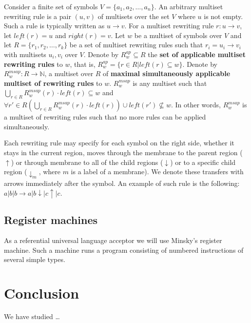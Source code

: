 \documentclass[llncs,submission,copyright,creativecommons]{../lib/lncs/llncs}
\begin{document}
Consider a finite set of symbols $V=\{a_1, a_2,\dots, a_n\}$. An arbitrary multiset rewriting rule is a pair $(u, v)$ of multisets over the set $V$ where $u$ is not empty. Such a rule is typically written as $u\rightarrow v$. For a multiset rewriting rule $r : u\rightarrow v$, let $left(r) = u$ and $right(r) = v$. Let $w$ be a multiset of symbols over $V$ and let $R=\{r_1, r_2,\dots, r_k\}$ be a set of multiset rewriting rules such that $r_i = u_i\rightarrow v_i$ with multisets $u_i, v_i$ over $V$. Denote by $R^{ap}_w\subseteq R$ the {\bf set of applicable multiset rewriting rules} to $w$, that is, $R^{ap}_w = \{r\in R|left(r)\subseteq w\}$. Denote by $R^{msap}_w: R\rightarrow \mathbb N$, a multiset over $R$ of {\bf maximal simultaneously applicable multiset of rewriting rules} to $w$. $R^{msap}_w$ is any multiset such that $\displaystyle\bigcup_{r\in R} R^{msap}_w(r)\cdot left(r)\subseteq w$ and $\forall r'\in R \left(\displaystyle\bigcup_{r\in R} R^{msap}_w(r)\cdot left(r)\right)\cup left(r')\nsubseteq w$. In other words, $R^{msap}_w$ is a multiset of rewriting rules such that no more rules can be applied simultaneously.



  
Each rewriting rule may specify for each symbol on the right side,
whether it stays in the current region,
moves through the membrane to the parent region ($\uparrow$)
or through membrane to all of the child regions ($\downarrow$)
or to a specific child region ($\downarrow_m$, where $m$ is a label of a membrane).
We denote these transfers with arrows immediately after the symbol.
An example of such rule is the following: $a|b|b\rightarrow a|b\downarrow |c\uparrow|c$.












\subsection{Register machines} %
\label{sub:register_machines}
  As a referential universal language acceptor we will use Minsky's register machine. Such a machine runs a program consisting of numbered instructions of several simple types.


  

\section{Conclusion}
\label{sec:conclusion}
We have studied \dots


\end{document}
